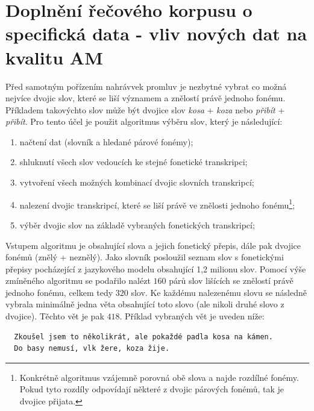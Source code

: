 \section{Doplnění řečového korpusu o specifická data - vliv nových dat na kvalitu AM}
\label{chap:realisation:corpus}

Před samotným pořízením nahrávvek promluv je nezbytné vybrat co možná nejvíce dvojic slov, které se liší významem a znělostí právě jednoho fonému. Příkladem takovýchto slov může být dvojice slov \textit{kosa} + \textit{koza} nebo \textit{přibít} + \textit{přibít}. Pro tento účel je použit algoritmus výběru slov, který je následující:

\begin{enumerate}
  \item načtení dat (slovník a hledané párové fonémy);
  \item shluknutí všech slov vedoucích ke stejné fonetické transkripci;
  \item vytvoření všech možných kombinací dvojic slovních transkripcí;
  \item nalezení dvojic transkripcí, které se liší právě ve znělosti jednoho fonému\footnote{Konkrétně algoritmus vzájemně porovná obě slova a najde rozdílné fonémy. Pokud tyto rozdíly odpovídají některé z dvojic párových fonémů, tak je dvojice přijata.};
  \item výběr dvojic slov na základě vybraných fonetických transkripcí;
\end{enumerate}

\noindent Vstupem algoritmu je  obsahující slova a jejich fonetický přepis, dále pak dvojice fonémů (znělý + neznělý). Jako slovník posloužil seznam slov s fonetickými přepisy pocházející z jazykového modelu obsahující 1,2 milionu slov. Pomocí výše zmíněného algoritmu se podařilo nalézt $160$ párů slov lišících se znělostí právě jednoho fonému, celkem tedy $320$ slov. Ke každému nalezenému slovu se následně vybrala minimálně jedna věta obsahující toto slovo (ale nikoli druhé slovo z dvojice). Těchto vět je pak $418$. Příklad vybraných vět je uveden níže:

\begin{verbatim}
  Zkoušel jsem to několikrát, ale pokaždé padla kosa na kámen.
  Do basy nemusí, vlk žere, koza žije.
\end{verbatim}

